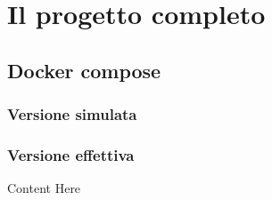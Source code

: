 \documentclass[../DocumentazioneProgetto.tex]{subfiles}
\begin{document}
	\section{Il progetto completo}
	\label{sec:ProgettoCompleto}
	\subsection{Docker compose} 
	\subsubsection{Versione simulata} 
	\subsubsection{Versione effettiva} 
	Content Here
\end{document}
